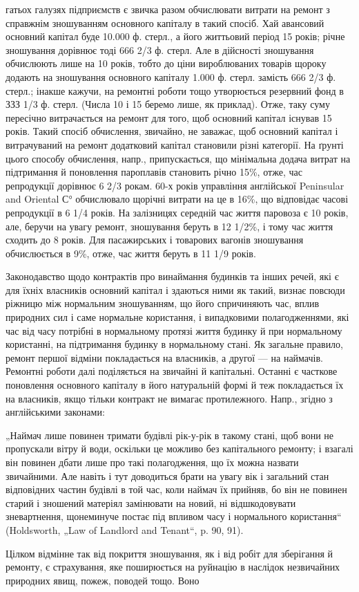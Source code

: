 гатьох галузях підприємств є звичка разом обчислювати витрати на ремонт з справжнім зношуванням
основного капіталу в такий спосіб. Хай авансовий основний капітал буде 10.000 ф. стерл., а його
життьовий період 15 років; річне зношування дорівнює тоді 666 2/3 ф. стерл. Але в дійсності
зношування обчислюють лише на 10 років, тобто до ціни вироблюваних товарів щороку додають на
зношування основного капіталу 1.000 ф. стерл. замість 666 2/3 ф. стерл.; інакше кажучи, на ремонтні
роботи тощо утворюється резервний фонд в ЗЗЗ 1/3 ф. стерл. (Числа 10 і 15 беремо лише, як приклад).
Отже, таку суму пересічно витрачається на ремонт для того, щоб основний капітал існував 15 років.
Такий спосіб обчислення, звичайно, не заважає, щоб основний капітал і витрачуваний на ремонт
додатковий капітал становили різні категорії. На ґрунті цього способу обчислення, напр.,
припускається, що мінімальна додача витрат на підтримання й поновлення пароплавів становить річно
15\%, отже, час репродукції дорівнює 6 2/3 рокам. 60-х років управління англійської Peninsular and
Oriental С° обчислювало щорічні витрати на це в 16\%, що відповідає часові репродукції в 6 1/4 років.
На залізницях середній час життя паровоза є 10 років, але, беручи на увагу ремонт, зношування беруть
в 12 1/2\%, і тому час життя сходить до 8 років. Для пасажирських і товарових вагонів зношування
обчислюється в 9\%, отже, час життя беруть в 11 1/9 років.

Законодавство щодо контрактів про винаймання будинків та інших речей, які є для їхніх власників
основний капітал і здаються ними як такий, визнає повсюди ріжницю між нормальним зношуванням, що
його спричиняють час, вплив природних сил і саме нормальне користання, і випадковими полагодженнями,
які час від часу потрібні в нормальному протязі життя будинку й при нормальному користанні, на
підтримання будинку в нормальному стані. Як загальне правило, ремонт першої відміни покладається на
власників, а другої — на наймачів. Ремонтні роботи далі поділяється на звичайні й капітальні.
Останні є часткове поновлення основного капіталу в його натуральній формі й теж покладається їх на
власників, якщо тільки контракт не вимагає протилежного. Напр., згідно з англійськими законами:

„Наймач лише повинен тримати будівлі рік-у-рік в такому стані, щоб вони не пропускали вітру й води,
оскільки це можливо без капітального ремонту; і взагалі він повинен дбати лише про такі
полагодження, що їх можна назвати звичайними. Але навіть і тут доводиться брати на увагу вік і
загальний стан відповідних частин будівлі в той час, коли наймач їх прийняв, бо він не повинен
старий і зношений матеріял замінювати на новий, ні відшкодовувати зневартнення, щонеминуче постає
під впливом часу і нормального користання“ (Holdsworth, „Law of Landlord and Tenant“, p. 90, 91).

Цілком відмінне так від покриття зношування, як і від робіт для зберігання й ремонту, є страхування,
яке поширюється на руйнацію в наслідок незвичайних природних явищ, пожеж, поводей тощо. Воно
